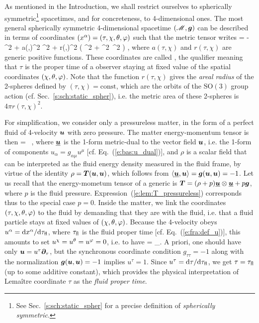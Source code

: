 As mentioned in the Introduction, we shall restrict ourselves to
spherically symmetric\footnote{See Sec.~\ref{s:sch:static_spher} for a precise
definition of \emph{spherically symmetric}.} spacetimes, and for concreteness, to 4-dimensional ones. The most general spherically symmetric 4-dimensional spacetime $(\mathscr{M},\bm{g})$
can be described in terms of coordinates $(x^\alpha)=(\tau,\chi,\theta,\varphi)$ such that
the metric tensor writes
\be \label{e:lem:metric_sync_coord}
     = - \dd\tau^2 + a(\tau,\chi)^2 \dd\chi^2
        + r(\tau,\chi)^2 \left( \dd\th^2 + \sin^2\th\, \dd\ph^2 \right)  ,
\ee
where $a(\tau,\chi)$ and $r(\tau,\chi)$ are generic positive functions.
These coordinates are called , the qualifier
 meaning that $\tau$ is the proper time of a observer staying
at fixed value of the spatial coordinates $(\chi,\theta,\varphi)$.
Note that the function $r(\tau,\chi)$ gives the \emph{areal radius}
of the 2-spheres
defined by $(\tau,\chi) = \mathrm{const}$, which are the orbits of the $\mathrm{SO}(3)$
group action (cf. Sec.~\ref{s:sch:static_spher}), i.e. the metric area of these
2-spheres is $4\pi r(\tau,\chi)^2$.

For simplification, we consider only a pressureless matter, in the form of a perfect
fluid of 4-velocity $\bm{u}$ with zero pressure. The matter energy-momentum tensor is then
\be \label{e:lem:T_pressureless}
     = \rho \,  \otimes {} ,
\ee
where $\underline{\bm{u}}$ is the 1-form metric-dual to the vector field $\bm{u}$,
i.e. the 1-form of components $u_\alpha = g_{\alpha\mu} u^\mu$ [cf. Eq.~(\ref{e:bas:u_dual})],
and $\rho$ is a scalar field that can be interpreted as the fluid energy density
measured in the fluid frame, by virtue of the identity
$\rho = \bm{T}(\bm{u}, \bm{u})$, which follows from $\langle \underline{\bm{u}}, \bm{u} \rangle = \bm{g}(\bm{u},\bm{u}) = -1$.
Let us recall that the energy-mometum tensor of a generic
 is
$\bm{T} = (\rho + p)\underline{\bm{u}} \otimes \underline{\bm{u}} + p \bm{g}$, where $p$
is the fluid pressure. Expression~(\ref{e:lem:T_pressureless}) corresponds thus
to the special case $p=0$.
Inside the matter, we link the coordinates $(\tau,\chi,\theta,\varphi)$ to the fluid by demanding
that they are  with the fluid, i.e. that a fluid particle
stays at fixed values of $(\chi,\theta,\varphi)$.
Because the 4-velocity obeys $u^\alpha = \mathrm{d} x^\alpha/\mathrm{d} \tau_{\rm fl}$, where
$\tau_{\rm fl}$ is the fluid proper time [cf. Eq.~(\ref{e:fra:def_u})], this
amounts to set $u^\chi=u^\theta = u^\varphi = 0$, i.e. to have
\be \label{e:lem:u_par_tau}
     = \wpar_\tau .
\ee
A priori, one should have only $\bm{u} =  u^\tau\bm{\partial}_\tau$, but the
synchronous coordinate condition $g_{\tau\tau} = -1$ along with the
normalization $\bm{g}(\bm{u},\bm{u})=-1$ implies $u^\tau=1$. Since $u^\tau = \mathrm{d}\tau / \mathrm{d}\tau_{\rm fl}$, we get $\tau = \tau_{\rm fl}$ (up to some additive constant), which provides the physical
interpretation of Lemaître coordinate $\tau$ as the \emph{fluid proper time}.

